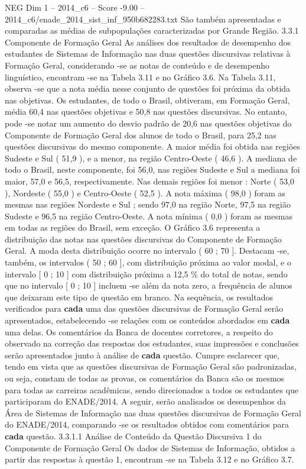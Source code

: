 \begin{textsample}{NEG Dim 1 – 2014\_c6 – Score -9.00 – 2014\_c6/enade\_2014\_sist\_inf\_950b682283.txt}
São também apresentadas e comparadas as médias de subpopulações caracterizadas por Grande Região. 3.3.1 Componente de Formação Geral As análises dos resultados de desempenho dos estudantes de Sistemas de Informação nas duas questões discursivas relativas à Formação Geral, considerando -se as notas de conteúdo e de desempenho linguístico, encontram -se na Tabela 3.11 e no Gráfico 3.6.
Na Tabela 3.11, observa -se que a nota média nesse conjunto de questões foi próxima da obtida nas objetivas.
Os estudantes, de todo o Brasil, obtiveram, em Formação Geral, média 60,4 nas questões objetivas e 50,8 nas questões discursivas.
No entanto, pode -se notar um aumento do desvio padrão de 20,6 nas questões objetivas do Componente de Formação Geral dos alunos de todo o Brasil, para 25,2 nas questões discursivas do mesmo componente.
A maior média foi obtida nas regiões Sudeste e Sul ( 51,9 ), e a menor, na região Centro-Oeste ( 46,6 ).
A mediana de todo o Brasil, neste componente, foi 56,0, nas regiões Sudeste e Sul a mediana foi maior, 57,0 e 56,5, respectivamente.
Nas demais regiões foi menor : Norte ( 53,0 ), Nordeste ( 55,0 ) e Centro-Oeste ( 52,5 ).
A nota máxima ( 98,0 ) foram as mesmas nas regiões Nordeste e Sul ; sendo 97,0 na região Norte, 97,5 na região Sudeste e 96,5 na região Centro-Oeste.
A nota mínima ( 0,0 ) foram as mesmas em todas as regiões do Brasil, sem exceção.
O Gráfico 3.6 representa a distribuição das notas nas questões discursivas do Componente de Formação Geral.
A moda desta distribuição ocorre no intervalo ( 60 ; 70 ].
Destacam -se, também, os intervalos ( 50 ; 60 ], com distribuição próxima ao valor modal, e o intervalo [ 0 ; 10 ] com distribuição próxima a 12,5 \% do total de notas, sendo que no intervalo [ 0 ; 10 ] incluem -se além da nota zero, a frequência de alunos que deixaram este tipo de questão em branco.
Na sequência, os resultados verificados para \textbf{cada} uma das questões discursivas de Formação Geral serão apresentados, estabelecendo -se relações com os conteúdos abordados em \textbf{cada} uma delas.
Os comentários da Banca de docentes corretores, a respeito do observado na correção das respostas dos estudantes, suas impressões e conclusões serão apresentados junto à análise de \textbf{cada} questão.
Cumpre esclarecer que, tendo em vista que as questões discursivas de Formação Geral são padronizadas, ou seja, constam de todas as provas, os comentários da Banca são os mesmos para todas as carreiras acadêmicas, sendo direcionados a todos os estudantes que participaram do ENADE/2014.
A seguir, serão analisados os desempenhos da Área de Sistemas de Informação nas duas questões discursivas de Formação Geral do ENADE/2014, comparando -se os resultados obtidos com comentários para \textbf{cada} questão. 3.3.1.1 Análise de Conteúdo da Questão Discursiva 1 do Componente de Formação Geral Os dados de Sistemas de Informação, obtidos a partir das respostas à questão 1, encontram -se na Tabela 3.12 e no Gráfico 3.7.

\end{textsample}
